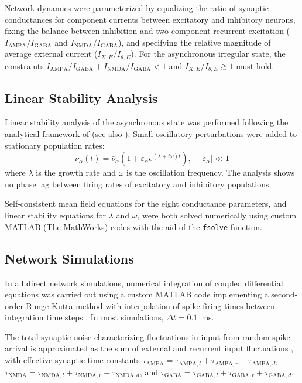 \documentclass[12pt]{article}
\begin{document}
Network dynamics were parameterized by equalizing the ratio of synaptic conductances for component currents between excitatory and inhibitory neurons, fixing the balance between inhibition and two-component recurrent excitation ($I_{\text{AMPA}}/I_{\text{GABA}}$ and $I_{\text{NMDA}}/I_{\text{GABA}}$), and specifying the relative magnitude of average external current ($I_{X,E}/I_{\theta,E}$). For the asynchronous irregular state, the constraints $I_{\text{AMPA}}/I_{\text{GABA}} + I_{\text{NMDA}}/I_{\text{GABA}} < 1$ and $I_{X,E}/I_{\theta,E} \gtrsim 1$ must hold.

\subsection{Linear Stability Analysis}

Linear stability analysis of the asynchronous state was performed following the analytical framework of \citet{BrunelWang2003} (see also \citet{AbbottVanVreeswijk1993, BrunelHakim1999}). Small oscillatory perturbations were added to stationary population rates:
\begin{equation}
\nu_\alpha(t) = \bar{\nu}_\alpha (1 + \varepsilon_\alpha e^{(\lambda + i\omega)t}), \quad |\varepsilon_\alpha| \ll 1
\end{equation}
where $\lambda$ is the growth rate and $\omega$ is the oscillation frequency. The analysis shows no phase lag between firing rates of excitatory and inhibitory populations.

Self-consistent mean field equations for the eight conductance parameters, and linear stability equations for $\lambda$ and $\omega$, were both solved numerically using custom MATLAB (The MathWorks) codes with the aid of the \texttt{fsolve} function.

\subsection{Network Simulations}

In all direct network simulations, numerical integration of coupled differential equations was carried out using a custom MATLAB code implementing a second-order Runge-Kutta method with interpolation of spike firing times between integration time steps \citep{Hansel1998}. In most simulations, $\Delta t = 0.1$~ms.

The total synaptic noise characterizing fluctuations in input from random spike arrival is approximated as the sum of external and recurrent input fluctuations \citep{FourcaudBrunel2002}, with effective synaptic time constants $\tau_{\text{AMPA}} = \tau_{\text{AMPA},l} + \tau_{\text{AMPA},r} + \tau_{\text{AMPA},d}$, $\tau_{\text{NMDA}} = \tau_{\text{NMDA},l} + \tau_{\text{NMDA},r} + \tau_{\text{NMDA},d}$, and $\tau_{\text{GABA}} = \tau_{\text{GABA},l} + \tau_{\text{GABA},r} + \tau_{\text{GABA},d}$.
\end{document}
